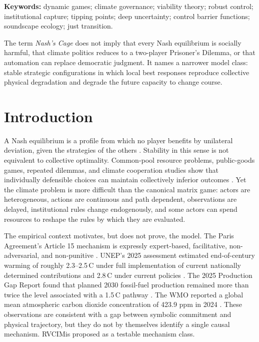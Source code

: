 \documentclass[11pt,a4paper]{article}
\numberwithin{equation}{section}
\theoremstyle{definition}
\theoremstyle{plain}
\theoremstyle{remark}
\newcommand{\RVCIM}{\textsc{RVCIM}}
\begin{document}
\noindent\textbf{Keywords:} dynamic games; climate governance; viability theory; robust control; institutional capture; tipping points; deep uncertainty; control barrier functions; soundscape ecology; just transition.

\vspace{0.8em}
\begin{boundarybox}
The term \emph{Nash's Cage} does not imply that every Nash equilibrium is socially harmful, that climate politics reduces to a two-player Prisoner's Dilemma, or that automation can replace democratic judgment. It names a narrower model class: stable strategic configurations in which local best responses reproduce collective physical degradation and degrade the future capacity to change course.
\end{boundarybox}

\tableofcontents
\newpage

\section{Introduction}

A Nash equilibrium is a profile from which no player benefits by unilateral deviation, given the strategies of the others \citep{nash1950}. Stability in this sense is not equivalent to collective optimality. Common-pool resource problems, public-goods games, repeated dilemmas, and climate cooperation studies show that individually defensible choices can maintain collectively inferior outcomes \citep{hardin1968,axelrod1984,ostrom1990,milinski2008,nordhaus2015}. Yet the climate problem is more difficult than the canonical matrix game: actors are heterogeneous, actions are continuous and path dependent, observations are delayed, institutional rules change endogenously, and some actors can spend resources to reshape the rules by which they are evaluated.

The empirical context motivates, but does not prove, the model. The Paris Agreement's Article 15 mechanism is expressly expert-based, facilitative, non-adversarial, and non-punitive \citep{unfccc2015,unfcccpaicc}. UNEP's 2025 assessment estimated end-of-century warming of roughly 2.3--2.5\,\textdegree C under full implementation of current nationally determined contributions and 2.8\,\textdegree C under current policies \citep{unep2025}. The 2025 Production Gap Report found that planned 2030 fossil-fuel production remained more than twice the level associated with a 1.5\,\textdegree C pathway \citep{productiongap2025}. The WMO reported a global mean atmospheric carbon dioxide concentration of 423.9 ppm in 2024 \citep{wmo2025}. These observations are consistent with a gap between symbolic commitment and physical trajectory, but they do not by themselves identify a single causal mechanism. \RVCIM is proposed as a testable mechanism class.
\end{document}
